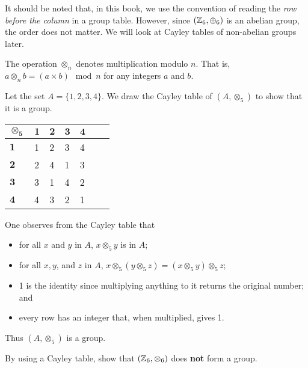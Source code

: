 It should be noted that, in this book, we use the convention of reading the \textit{row before the column} in a group table. However, since $(\mathbb{Z}_6, \oplus_6)$ is an abelian group, the order does not matter. We will look at Cayley tables of non-abelian groups later.

\begin{definition}
    The operation $\otimes_n$ denotes multiplication modulo $n$. That is, $a \otimes_n b = (a \times b) \mod{n}$ for any integers $a$ and $b$.
\end{definition}
\begin{example}
    Let the set $A = \{1, 2, 3, 4\}$. We draw the Cayley table of $(A, \otimes_5)$ to show that it is a group.
    \begin{table}[h]
        \centering
        \begin{tabular}{|l|l|l|l|l|l|l|}
        \hline
        $\boldsymbol{\otimes_5}$ & $\boldsymbol{1}$ & $\boldsymbol{2}$ & $\boldsymbol{3}$ & $\boldsymbol{4}$ \\ \hline
        $\boldsymbol{1}$          & 1          & 2          & 3          & 4          \\ \hline
        $\boldsymbol{2}$          & 2          & 4          & 1          & 3          \\ \hline
        $\boldsymbol{3}$          & 3          & 1          & 4          & 2          \\ \hline
        $\boldsymbol{4}$          & 4          & 3          & 2          & 1          \\ \hline
        \end{tabular}
    \end{table}

    One observes from the Cayley table that
    \begin{itemize}
        \item for all $x$ and $y$ in $A$, $x \otimes_5 y$ is in $A$;
        \item for all $x, y$, and $z$ in $A$, $x \otimes_5 (y \otimes_5 z) = (x \otimes_5 y) \otimes_5 z$;
        \item 1 is the identity since multiplying anything to it returns the original number; and
        \item every row has an integer that, when multiplied, gives 1.
    \end{itemize}
    Thus $(A, \otimes_5)$ is a group.
\end{example}

\begin{exercise}
    By using a Cayley table, show that $(\mathbb{Z}_6, \otimes_6)$ does \textbf{not} form a group.
\end{exercise}

